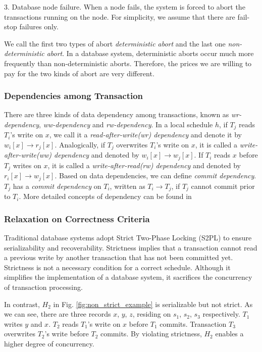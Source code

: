 \documentclass[conference]{IEEEtran}
\begin{document}
3. Database node failure.
When a node fails, the system is forced to abort the transactions running on the node. For simplicity, we assume that there are fail-stop failures only.

We call the first two types of abort \emph{deterministic abort} and the last one \emph{non-deterministic abort}.
In a database system, deterministic aborts occur much more frequently than non-deterministic aborts.
Therefore, the prices we are willing to pay for the two kinds of abort are very different.

\subsubsection{Dependencies among Transaction}

There are three kinds of data dependency among transactions, known as
\emph{wr-dependency},
\emph{ww-dependency}
and \emph{rw-dependency}.
In a local schedule ${h}$, if ${T_j}$ reads ${T_i}$'s write on ${x}$,
we call it a \emph{read-after-write(wr) dependency} and denote it by ${w_i[x] \rightarrow r_j[x]}$.
Analogically, if ${T_j}$ overwrites ${T_i}$'s write on ${x}$, it is called a \emph{write-after-write(ww) dependency} and denoted by ${w_i[x] \rightarrow w_j[x]}$.
If ${T_i}$ reads ${x}$ before ${T_j}$ writes on ${x}$, it is called a \emph{write-after-read(rw) dependency} and denoted by ${r_i[x] \rightarrow w_j[x]}$.
Based on data dependencies, we can define \emph{commit dependency}. ${T_j}$ has a \emph{commit dependency} on ${T_i}$, written as ${T_i \rightarrow T_j}$, if ${T_j}$ cannot commit prior to ${T_i}$.
More detailed concepts of dependency can be found in \cite{Dependency:conf/sigmod/ChrysanthisR90} \cite{Dependency:conf/sigmod/BilirisDGJR94}

\subsubsection{Relaxation on Correctness Criteria}

Traditional database systems adopt Strict Two-Phase Locking (S2PL) \cite{DBLP:conf/vldb/Raz92} to ensure serializability and recoverability.
Strictness implies that a transaction cannot read a previous write by another transaction that has not been committed yet.
Strictness is not a necessary condition for a correct schedule.
Although it simplifies the implementation of a database system, it sacrifices the concurrency of transaction processing.

In contrast, ${H_2}$ in Fig. \ref{fig:non_strict_example} is serializable but not strict.
As we can see, there are three records ${x}$, ${y}$, ${z}$, residing on ${s_1}$, ${s_2}$, ${s_3}$ respectively.
${T_1}$ writes ${y}$ and ${x}$.
${T_2}$ reads ${T_1}$'s write on ${x}$ before ${T_1}$ commits.
Transaction ${T_3}$ overwrites ${T_2}$'s write before ${T_2}$ commits.
By violating strictness, ${H_2}$  enables a higher degree of concurrency.
\end{document}

